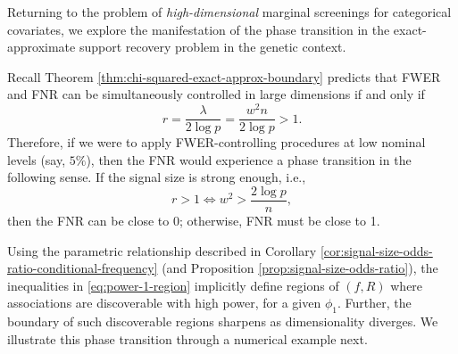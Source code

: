 

Returning to the problem of \emph{high-dimensional} marginal screenings for categorical covariates, we explore the manifestation of the phase transition in the exact-approximate support recovery problem in the genetic context.

Recall Theorem \ref{thm:chi-squared-exact-approx-boundary} predicts that FWER and FNR can be simultaneously controlled in large dimensions if and only if 
\begin{equation}
    r = \frac{\lambda}{2\log{p}} = \frac{w^2n}{2\log{p}} > 1.
\end{equation}
Therefore, if we were to apply FWER-controlling procedures at low nominal levels (say, $5\%$), then the FNR would experience a phase transition
in the following sense.  If the signal size is strong enough, i.e., 
\begin{equation} \label{eq:power-1-region}
    r>1 \iff w^2 > \frac{2\log{p}}{n},
\end{equation}
then the FNR can be close to 0; otherwise, FNR must be close to 1.

Using the parametric relationship described in Corollary \ref{cor:signal-size-odds-ratio-conditional-frequency} (and Proposition \ref{prop:signal-size-odds-ratio}), 
the inequalities in \eqref{eq:power-1-region} implicitly define regions of $(f, R)$ where associations are discoverable with high power, for a given $\phi_1$.
Further, the boundary of such discoverable regions sharpens as dimensionality diverges. 
We illustrate this phase transition through a numerical example next.


